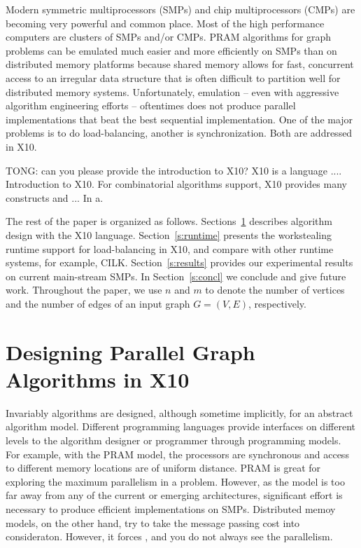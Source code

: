 \documentclass{llncs}
\begin{document}
 Modern symmetric multiprocessors (SMPs) and chip multiprocessors (CMPs) 
 are becoming very powerful and common place. Most of the high performance
 computers are clusters of SMPs and/or CMPs. PRAM algorithms for graph problems can be emulated much easier and more
 efficiently on SMPs than on distributed memory platforms because shared memory allows for fast, concurrent access
to an irregular data structure that is often difficult to partition well for distributed memory systems. 
 Unfortunately, emulation -- even with aggressive algorithm engineering efforts --
 oftentimes does not produce parallel implementations that beat the
 best sequential implementation. One of the major problems is to do load-balancing, another is synchronization. Both are addressed in X10.
 
 {TONG: can you please provide the introduction to X10}? X10 is a language .... Introduction to X10.  For combinatorial algorithms support, X10 provides many constructs and ...
 In a.   

 The rest of the paper is organized as follows. Sections~\ref{s:design} describes algorithm design with the X10 language.
 Section~\ref{s:runtime} presents the workstealing runtime support for load-balancing in X10, and compare with other runtime systems, for example, CILK. 
 Section~\ref{s:results} provides our experimental results on current main-stream SMPs.
 In Section~\ref{s:concl} we conclude and give future work. 
 Throughout the paper, we
 use $n$ and $m$ to denote the number of vertices and the number of
 edges of an input graph $G=(V,E)$, respectively. 
  

\section{Designing Parallel Graph Algorithms in X10}
\label{s:design}

 Invariably algorithms are designed, although sometime implicitly, for an abstract algorithm model. Different programming languages provide interfaces on different levels to the algorithm designer or programmer through programming models. For example, with the PRAM model, the processors are synchronous and access to different memory locations are of uniform distance. PRAM is great for exploring the maximum parallelism in a problem. However, as the model is too far away from any of the current or emerging architectures, significant effort is necessary to produce efficient implementations on SMPs. Distributed memoy models, on the other hand, try to take the message passing cost into consideraton. However, it forces , and you do not always see the parallelism.
\end{document}
